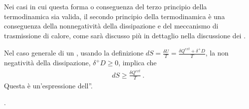 \documentclass[letterpaper,10pt,italian]{jupyterBook}
\begin{document}
\sphinxAtStartPar
Nei casi in cui questa forma o conseguenza del terzo principio della termodinamica sia valida, il secondo principio della termodinamica è una conseguenza della non\sphinxhyphen{}negatività della dissipazione e del meccanismo di trasmissione di calore, come sarà discusso più in dettaglio nella discussione dei {\hyperref[\detokenize{ch/thermodynamics/principles-second:physics-hs-thermodynamics-principles-second-composite}]{}}.

\sphinxAtStartPar
Nel caso generale di un , usando la definizione \(dS = \frac{\delta U}{T} = \frac{\delta Q^{ext} + \delta^+ D}{T}\), la non negatività della dissipazione, \(\delta^+ D \ge 0\), implica che
\begin{equation*}
\begin{split}d S \ge \frac{\delta Q^{ext}}{T} \ .\end{split}
\end{equation*}
\sphinxAtStartPar
Questa è un’espressione dell”{\hyperref[\detokenize{ch/thermodynamics/principles-second:physics-hs-thermodynamics-principles-second}]{}}.

\sphinxAtStartPar
{}    .
\end{document}

